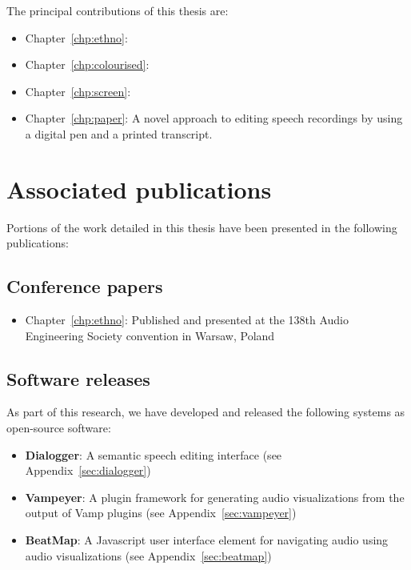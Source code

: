 The principal contributions of this thesis are:
\begin{itemize}
  \item Chapter~\ref{chp:ethno}: 
  \item Chapter~\ref{chp:colourised}: 
  \item Chapter~\ref{chp:screen}: 
  \item Chapter~\ref{chp:paper}:
    A novel approach to editing speech recordings by using a digital pen and a printed transcript.
\end{itemize}

\section{Associated publications}\label{sec:intro-publications}

Portions of the work detailed in this thesis have been presented in the following publications:

\subsection*{Conference papers}

\begin{itemize}
  \item Chapter~\ref{chp:ethno}: Published and presented at the 138th Audio Engineering Society convention in Warsaw,
    Poland \citep{Baume2015}
\end{itemize}

\subsection*{Software releases}
As part of this research, we have developed and released the following systems as open-source software:

\begin{itemize}
  \item \textbf{Dialogger}: A semantic speech editing interface (see Appendix~\ref{sec:dialogger})
  \item \textbf{Vampeyer}: A plugin framework for generating audio visualizations from the output of Vamp plugins
    (see Appendix~\ref{sec:vampeyer})
  \item \textbf{BeatMap}: A Javascript user interface element for navigating audio using audio visualizations
    (see Appendix~\ref{sec:beatmap})
\end{itemize}

